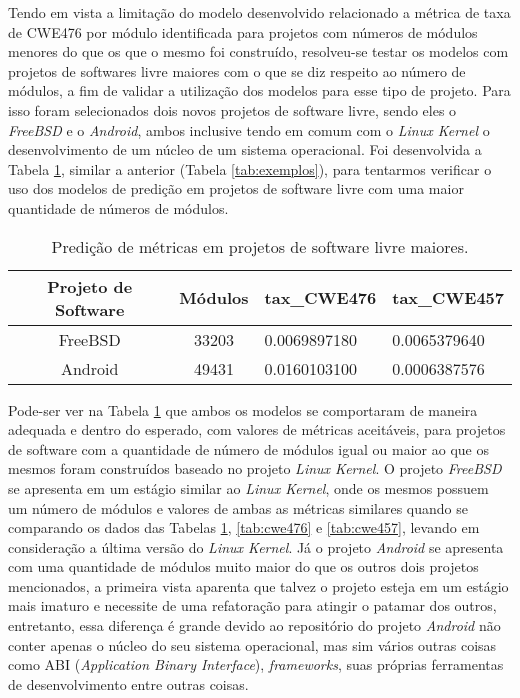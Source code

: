 Tendo em vista a limitação do modelo desenvolvido relacionado a métrica de taxa
de CWE476 por módulo identificada para projetos com números de módulos menores
do que os que o mesmo foi construído, resolveu-se testar os modelos com projetos
de softwares livre maiores com o que se diz respeito ao número de módulos, a fim
de validar a utilização dos modelos para esse tipo de projeto. Para isso foram
selecionados dois novos projetos de software livre, sendo eles o
\textit{FreeBSD} e o \textit{Android}, ambos inclusive tendo em comum com o
\textit{Linux Kernel} o desenvolvimento de um núcleo de um sistema operacional.
Foi desenvolvida a Tabela \ref{tab:exemplos2}, similar a anterior (Tabela
\ref{tab:exemplos}), para tentarmos verificar o uso dos modelos de predição em
projetos de software livre com uma maior quantidade de números de módulos.

\begin{table}[h]
 \centering
 \begin{tabular}{ccll}
  \hline
  \rowcolor[HTML]{EFEFEF} 
  Projeto de Software & Módulos &
  \multicolumn{1}{c}{\cellcolor[HTML]{EFEFEF}tax\_CWE476} &
  \multicolumn{1}{c}{\cellcolor[HTML]{EFEFEF}tax\_CWE457} \\ \hline
  FreeBSD             & 33203   & 0.0069897180
  & 0.0065379640                                           \\ \hline
  Android             & 49431   & 0.0160103100
  & 0.0006387576                                          \\ \hline
 \end{tabular}
 \caption{Predição de métricas em projetos de software livre maiores.}
 \label{tab:exemplos2}
\end{table}

Pode-ser ver na Tabela \ref{tab:exemplos2} que ambos os modelos se comportaram
de maneira adequada e dentro do esperado, com valores de métricas aceitáveis,
para projetos de software com a quantidade de número de módulos igual ou maior
ao que os mesmos foram construídos baseado no projeto \textit{Linux Kernel}. O
projeto \textit{FreeBSD} se apresenta em um estágio similar ao \textit{Linux
Kernel}, onde os mesmos possuem um número de módulos e valores de ambas as
métricas similares quando se comparando os dados das Tabelas
\ref{tab:exemplos2}, \ref{tab:cwe476} e \ref{tab:cwe457}, levando em
consideração a última versão do \textit{Linux Kernel}. Já o projeto
\textit{Android} se apresenta com uma quantidade de módulos muito maior do que
os outros dois projetos mencionados, a primeira vista aparenta que talvez o
projeto esteja em um estágio mais imaturo e necessite de uma refatoração para
atingir o patamar dos outros, entretanto, essa diferença é grande devido ao
repositório do projeto \textit{Android} não conter apenas o núcleo do seu
sistema operacional, mas sim vários outras coisas como ABI (\textit{Application
Binary Interface}), \textit{frameworks}, suas próprias ferramentas de
desenvolvimento entre outras coisas. 

